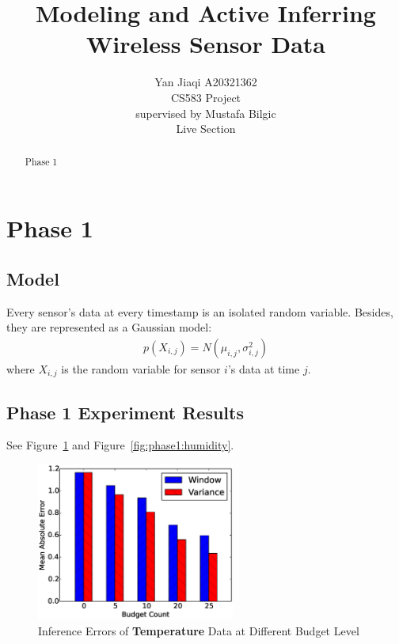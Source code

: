 \documentclass[12pt]{article}  %
\title{Modeling and Active Inferring Wireless Sensor Data}
\author{Yan Jiaqi A20321362\\
CS583 Project\\
supervised by
Mustafa Bilgic\\
Live Section
}
\theoremstyle{definition}
\theoremstyle{remark}
\begin{document}
\maketitle

\begin{abstract}
Phase 1
\end{abstract}

\newpage
\tableofcontents

\newpage

\section{Phase 1}

\subsection{Model}
Every sensor's data at every timestamp is an isolated random variable.
Besides, they are represented as a Gaussian model:
\begin{align}
        p(X_{i,j}) = N(\mu_{i,j}, \sigma_{i,j}^2)
\end{align}
where $X_{i, j}$ is the random variable for sensor $i$'s data at time $j$.

\subsection{Phase 1 Experiment Results}
\label{sec:phase1:result}
See Figure~\ref{fig:phase1:temperature} and Figure~\ref{fig:phase1:humidity}.

\begin{figure}[H]
\centering
        \includegraphics[width=0.58\textwidth]{../phase1/temperature_err}
        \caption{Inference Errors of \textbf{Temperature} Data at Different Budget Level}
\label{fig:phase1:temperature}
\end{figure}
\end{document}
